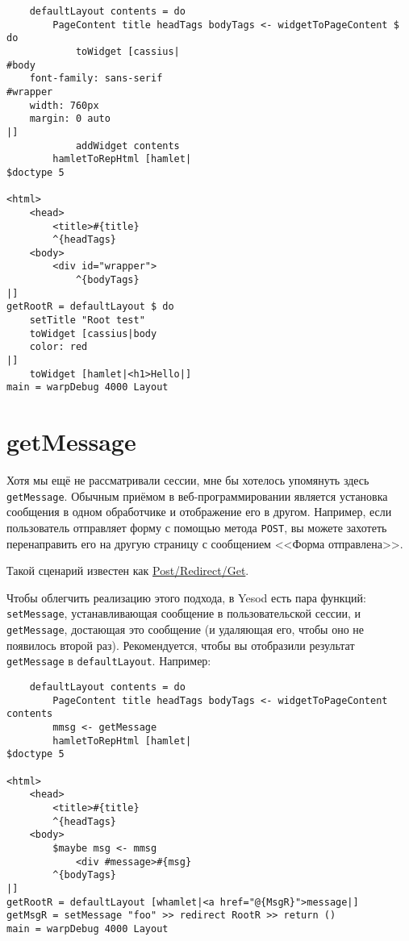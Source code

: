 \begin{lstlisting}
    defaultLayout contents = do
        PageContent title headTags bodyTags <- widgetToPageContent $ do
            toWidget [cassius|
#body
    font-family: sans-serif
#wrapper
    width: 760px
    margin: 0 auto
|]
            addWidget contents
        hamletToRepHtml [hamlet|
$doctype 5

<html>
    <head>
        <title>#{title}
        ^{headTags}
    <body>
        <div id="wrapper">
            ^{bodyTags}
|]
getRootR = defaultLayout $ do
    setTitle "Root test"
    toWidget [cassius|body
    color: red
|]
    toWidget [hamlet|<h1>Hello|]
main = warpDebug 4000 Layout
\end{lstlisting}%

\section {getMessage}

Хотя мы ещё не рассматривали сессии, мне бы хотелось упомянуть здесь \lstinline!getMessage!. Обычным приёмом в веб-программировании является установка сообщения в одном обработчике и отображение его в другом. Например, если пользователь отправляет форму с помощью метода \lstinline!POST!, вы можете захотеть перенаправить его на другую страницу с сообщением <<Форма отправлена>>.

\begin{remark}
Такой сценарий известен как \href{http://en.wikipedia.org/wiki/Post/Redirect/Get}{Post/Redirect/Get}\footnotemark[\value{footnote}].
\end{remark}


Чтобы облегчить реализацию этого подхода, в Yesod есть пара функций: \lstinline!setMessage!, устанавливающая сообщение в пользовательской сессии, и \lstinline!getMessage!, достающая это сообщение (и удаляющая его, чтобы оно не появилось второй раз). Рекомендуется, чтобы вы отобразили результат \lstinline!getMessage! в \lstinline!defaultLayout!. Например:

\begin{lstlisting}
    defaultLayout contents = do
        PageContent title headTags bodyTags <- widgetToPageContent contents
        mmsg <- getMessage
        hamletToRepHtml [hamlet|
$doctype 5

<html>
    <head>
        <title>#{title}
        ^{headTags}
    <body>
        $maybe msg <- mmsg
            <div #message>#{msg}
        ^{bodyTags}
|]
getRootR = defaultLayout [whamlet|<a href="@{MsgR}">message|]
getMsgR = setMessage "foo" >> redirect RootR >> return ()
main = warpDebug 4000 Layout
\end{lstlisting}%

